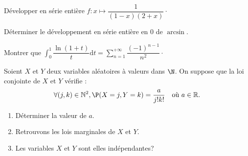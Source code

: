 \documentclass[twoside,a4paper,french,10pt]{VcCours}
\newcommand{\dt}{\text{d}t}
\begin{document}
\begin{Exercice}
  Développer en série entière $f : x \mapsto \dfrac{1}{(1-x)(2+x)} \cdot$
\end{Exercice}

\begin{Exercice}
  Déterminer le développement en série entière en $0$ de $\arcsin$.
\end{Exercice}



\begin{Exercice}
  Montrer que $\int_{0}^1 \dfrac{\ln(1+t)}{t}\dt = \sum_{n=1}^{+ \infty} \dfrac{(-1)^{n-1}}{n^2} \cdot$
\end{Exercice}

\begin{Exercice}
  Soient $X$ et $Y$ deux variables aléatoires à valeurs dans $\N$. On suppose que la loi conjointe de $X$ et $Y$ vérifie :
  \[
  \forall (j,k) \in \mathbb{N}^2,  \P( X = j,Y = k ) = \frac{a}{j!k!}\quad\text{où $a \in \mathbb{R}$.}
  \]
  \begin{enumerate}
  \item
    Déterminer la valeur de $a$.
  \item
    Retrouvons les lois marginales de $X$ et $Y$.
  \item
    Les variables $X$ et $Y$ sont elles indépendantes?
  \end{enumerate}
\end{Exercice}
\end{document}
